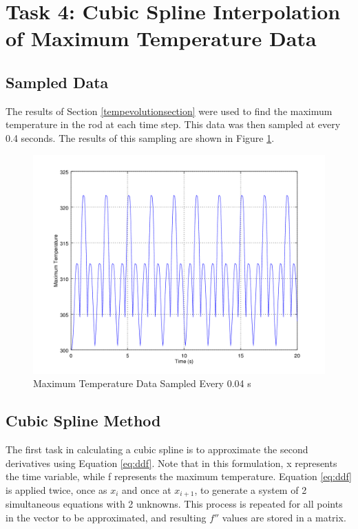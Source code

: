 \documentclass[12pt]{amsart}
\begin{document}
\section{Task 4: Cubic Spline Interpolation of Maximum Temperature Data}

\subsection{Sampled Data} \label{datasamplesection}
The results of Section \ref{tempevolutionsection} were used to find the maximum temperature in the rod at each time step. This data was then sampled at every 0.4 seconds. The results of this sampling are shown in Figure \ref{fig:maxtempsamples}.

\begin{center}
\begin{figure}
\includegraphics[scale= 0.7]{task4fig1}
\caption{Maximum Temperature Data Sampled Every 0.04 s}
\label{fig:maxtempsamples}
\end{figure}
\end{center}

\subsection{Cubic Spline Method}
The first task in calculating a cubic spline is to approximate the second derivatives using Equation \ref{eq:ddf}. Note that in this formulation, x represents the time variable, while f represents the maximum temperature. Equation \ref{eq:ddf} is applied twice, once as $x_i$ and once at $x_{i+1}$, to generate a system of 2 simultaneous equations with 2 unknowns. This process is repeated for all points in the vector to be approximated, and resulting $f''$ values are stored in a matrix. 
\end{document}
